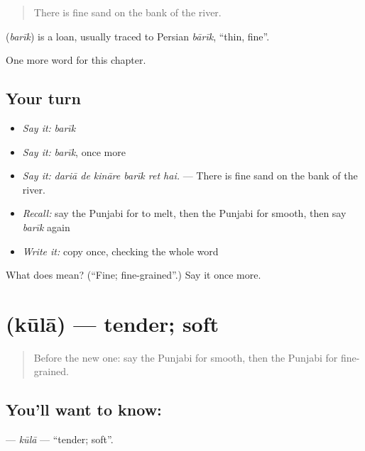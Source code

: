 \begin{quote}
There is fine sand on the bank of the river.
\end{quote}

\begin{cousinweb}
\textbf{} (\emph{barīk}) is a loan, usually traced to Persian \emph{bārīk}, \textquotedblleft{}thin, fine\textquotedblright{}.
\end{cousinweb}

\begin{grammarlens}[title={What you've built}]
One more word for this chapter.
\end{grammarlens}

\subsection*{Your turn}
\begin{itemize}
\raggedright
  \item \emph{Say it:} \emph{barīk}
  \item \emph{Say it:} \emph{barīk}, once more
  \item \emph{Say it:} \emph{dariā de kināre barīk ret hai.} — There is fine sand on the bank of the river.
  \item \emph{Recall:} say the Punjabi for to melt, then the Punjabi for smooth, then say \emph{barīk} again
  \item \emph{Write it:} copy \textbf{} once, checking the whole word
\end{itemize}

\begin{tcolorbox}[breakable,colback=teal!4,colframe=teal!35!black,title={Before you move on}]
What does  mean? (\textquotedblleft{}Fine; fine-grained\textquotedblright{}.) Say it once more.
\end{tcolorbox}
\section[\texorpdfstring{\pa{ਕੂਲਾ} (kūlā)}{ਕੂਲਾ (kūlā)}]{ (kūlā) — tender; soft}

\label{lesson:PA-C297-kula}



\begin{quote}
Before the new one: say the Punjabi for smooth, then the Punjabi for fine-grained.
\end{quote}

\subsection*{You'll want to know: }
\textbf{} — \emph{kūlā} — \textquotedblleft{}tender; soft\textquotedblright{}.

